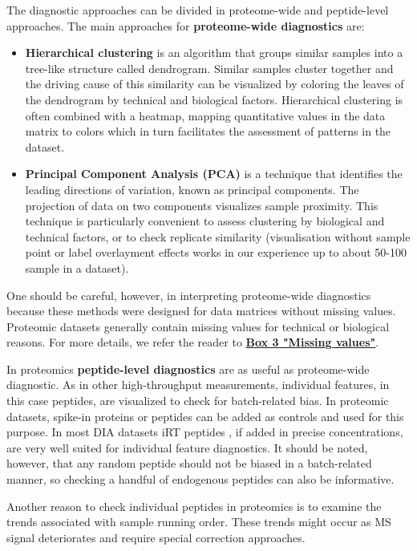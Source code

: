 \documentclass[num-refs]{wiley-article}
\begin{document}
The diagnostic approaches can be divided in proteome-wide and peptide-level approaches. The main approaches for \textbf{proteome-wide diagnostics} are:
\begin{itemize}
	\item \textbf{Hierarchical clustering} is an algorithm that groups similar samples into a tree-like structure called dendrogram. Similar samples cluster together and the driving cause of this similarity can be visualized by coloring the leaves of the dendrogram by technical and biological factors. Hierarchical clustering is often combined with a heatmap, mapping quantitative values in the data matrix to colors which in turn facilitates the assessment of patterns in the dataset.
	\item \textbf{Principal Component Analysis (PCA)} is a technique that identifies the leading directions of variation, known as principal components. The projection of data on two components  visualizes sample proximity. This technique is particularly convenient to assess clustering by biological and technical factors, or to check replicate similarity (visualisation without sample point or label overlayment effects works in our experience up to about 50-100 sample in a dataset).
\end{itemize}

One should be careful, however, in interpreting proteome-wide diagnostics because these methods were designed for data matrices without missing values. Proteomic datasets generally contain missing values for technical or biological reasons. For more details, we refer the reader to \textbf{\hyperref[box:Box3_missingness]{Box 3 "Missing values"}}.



In proteomics \textbf{peptide-level diagnostics} are as useful as proteome-wide diagnostic. As in other high-throughput measurements, individual features, in this case peptides, are visualized to check for batch-related bias. In proteomic datasets, spike-in proteins or peptides can be added as controls and used for this purpose. In most DIA datasets iRT peptides \cite{Escher:2012aa}, if added in precise concentrations, are very well suited for individual feature diagnostics.
It should be noted, however, that any random peptide should not be biased in a batch-related manner, so checking a handful of endogenous peptides can also be informative.

Another reason to check individual peptides in proteomics is to examine the trends associated with sample running order. These trends might occur as MS signal deteriorates and require special correction approaches.
\end{document}
